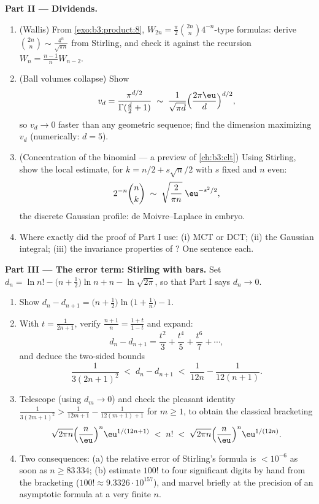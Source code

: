 \begin{problem}
\medskip
\noindent\textbf{Part II --- Dividends.}
\begin{enumerate}[resume]
  \item (Wallis) From \cref{exo:b3:product:8}, $W_{2n} =
        \frac\pi2\binom{2n}n4^{-n}$-type formulas: derive
        $\binom{2n}{n} \sim \frac{4^n}{\sqrt{\pi n}}$ from
        Stirling, and check it against the recursion $W_{n} =
        \frac{n-1}nW_{n-2}$.
  \item (Ball volumes collapse) Show
        \[
        v_d = \frac{\pi^{d/2}}{\Gamma(\frac d2 + 1)}
        \;\sim\; \frac{1}{\sqrt{\pi d}}
        \Bigl(\frac{2\pi\eu}{d}\Bigr)^{d/2},
        \]
        so $v_d \to 0$ faster than any geometric sequence;
        find the dimension maximizing $v_d$ (numerically: $d =
        5$).
  \item (Concentration of the binomial --- a preview of
        \cref{ch:b3:clt}) Using Stirling, show the local
        estimate, for $k = n/2 + s\sqrt n/2$ with $s$ fixed
        and $n$ even:
        \[
        2^{-n}\binom{n}{k} \;\sim\;
        \sqrt{\frac{2}{\pi n}}\;\eu^{-s^2/2},
        \]
        the discrete Gaussian profile: de Moivre--Laplace in
        embryo.
  \item Where exactly did the proof of Part I use: (i) MCT or
        DCT; (ii) the Gaussian integral; (iii) the invariance
        properties of ? One sentence each.
\end{enumerate}

\medskip
\noindent\textbf{Part III --- The error term: Stirling with
bars.} Set $d_n = \ln n! - \bigl(n + \tfrac12\bigr)\ln n + n -
\ln\sqrt{2\pi}$, so that Part I says $d_n \to 0$.
\begin{enumerate}[resume]
  \item Show $d_n - d_{n+1} = \bigl(n +
        \tfrac12\bigr)\ln\bigl(1 + \tfrac1n\bigr) - 1$.
  \item With $t = \frac1{2n+1}$, verify $\frac{n+1}n =
        \frac{1+t}{1-t}$ and expand:
        \[
        d_n - d_{n+1} = \frac{t^2}3 + \frac{t^4}5 +
        \frac{t^6}7 + \cdots,
        \]
        and deduce the two-sided bounds
        \[
        \frac1{3(2n+1)^2} \;<\; d_n - d_{n+1} \;<\;
        \frac1{12n} - \frac1{12(n+1)} .
        \]
  \item Telescope (using $d_m \to 0$) and check the pleasant
         identity $\frac1{3(2m+1)^2} >
        \frac1{12m+1} - \frac1{12(m+1)+1}$ for $m \geq 1$, to
        obtain the classical bracketing
        \[
        \sqrt{2\pi n}\Bigl(\frac n\eu\Bigr)^n
        \eu^{1/(12n+1)} \;<\; n! \;<\;
        \sqrt{2\pi n}\Bigl(\frac n\eu\Bigr)^n\eu^{1/(12n)} .
        \]
  \item Two consequences: (a) the relative error of Stirling's
        formula is $< 10^{-6}$ as soon as $n \geq 83\,334$;
        (b) estimate $100!$ to four significant digits by hand
        from the bracketing ($100! \approx 9.3326\cdot
        10^{157}$), and marvel briefly at the precision of an
        asymptotic formula at a very finite $n$.
\end{enumerate}


\end{problem}
